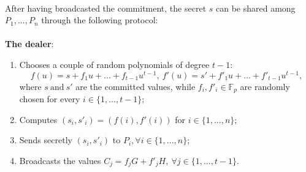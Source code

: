 \\
After having broadcasted the commitment, the secret $s$ can be shared among $P_1, ..., P_n$ through the following protocol:
\\
\\
{\bf The dealer}:
\begin{enumerate}
	\item Chooses a couple of random polynomials of degree $t - 1$: 
	$$f(u) = s + f_1u + ... + f_{t - 1}u^{t - 1}, \ f'(u) = s' + f'_1u + ... + f'_{t - 1}u^{t - 1},$$
	where $s \ \text{and} \ s'$ are the committed values, while $f_i, f'_i \in \mathbb{F}_p$ are randomly chosen for every $i \in \{1, ..., t - 1\}$;
	\item Computes $(s_i, s'_i) = (f(i), f'(i))$ for $i \in \{1, ..., n\}$;
	\item Sends secretly $(s_i, s'_i)$ to $P_i, \forall i \in \{1, ..., n\}$;
	\item Broadcasts the values $C_j = f_jG + f'_jH, \ \forall j \in \{1, ..., t - 1\}$.
\end{enumerate}

\bigskip

